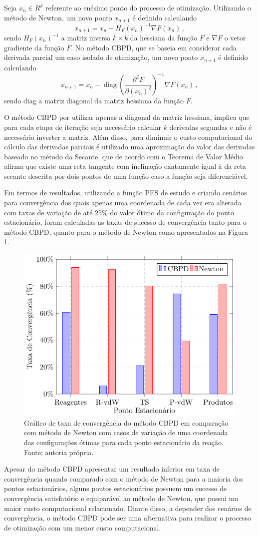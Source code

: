 \documentclass{pssbmac}
\DeclareMathOperator{\diag}{diag}
\begin{document}
Seja $x_n \in R^k$ referente ao enésimo ponto do processo de otimização. Utilizando o método de Newton, um novo ponto $x_{n+1}$ é definido calculando
%
\begin{equation}
  x_{n+1} = x_n - H_F(x_n)^{-1} \nabla F(x_n) \,,
\end{equation}
%
sendo $H_F(x_n)^{-1}$ a matriz inversa $k \times k$ da hessiana da função $F$ e $\nabla F$ o vetor gradiente da função $F$.
No método CBPD, que se baseia em considerar cada derivada parcial um caso isolado de otimização, um novo ponto $x_{n+1}$ é definido calculando
%
\begin{equation}
  x_{n+1} = x_n - \diag{\left(\frac{\partial^2 F}{\partial (x_{n})^2 }\right)}^{-1} \nabla F(x_n) \,,
\end{equation}
%
sendo diag a matriz diagonal da matriz hessiana da função $F$.

O método CBPD por utilizar apenas a diagonal da matriz hessiana, implica que para cada etapa de iteração seja necessário calcular $k$ derivadas segundas e não é necessário inverter a matriz. Além disso, para diminuir o custo computacional do cálculo das derivadas parciais é utilizado uma aproximação do valor das derivadas baseado no método da Secante, que de acordo com o Teorema de Valor Médio \cite{calculo_1} afirma que existe uma reta tangente com inclinação exatamente igual à da reta secante descrita por dois pontos de uma função caso a função seja diferenciável.

Em termos de resultados, utilizando a função PES de estudo e criando cenários para convergência dos quais apenas uma coordenada de cada vez era alterada com taxas de variação de até 25\% do valor ótimo da configuração do ponto estacionário, foram calculadas as taxas de sucesso de convergência tanto para o método CBPD, quanto para o método de Newton como apresentados na Figura \ref{figura01}.
%
\begin{figure}[H]
\centering
\includegraphics[width=.425\textwidth]{image}
\caption{ {\small Gráfico de taxa de convergência do método CBPD em comparação com método de Newton com casos de variação de uma coordenada das configurações ótimas para cada ponto estacionário da reação. Fonte: autoria própria.}}
\label{figura01}
\end{figure}
%
Apesar do método CBPD apresentar um resultado inferior em taxa de convergência quando comparado com o método de Newton para a maioria dos pontos estacionários, alguns pontos estacionários possuem um sucesso de convergência satisfatório e equiparável ao método de Newton, que possui um maior custo computacional relacionado. Diante disso, a depender dos cenários de convergência, o método CBPD pode ser uma alternativa para realizar o processo de otimização com um menor custo computacional.

\printbibliography
\end{document}
